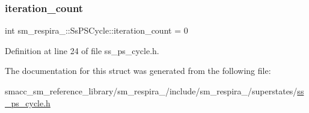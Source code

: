 \subsubsection{\texorpdfstring{iteration\+\_\+count}{iteration\_count}}
{\footnotesize\ttfamily int sm\+\_\+respira\+\_\+::\+Ss\+P\+S\+Cycle\+::iteration\+\_\+count = 0}



Definition at line 24 of file ss\+\_\+ps\+\_\+cycle.\+h.



The documentation for this struct was generated from the following file\+:\begin{DoxyCompactItemize}
\item 
smacc\+\_\+sm\+\_\+reference\+\_\+library/sm\+\_\+respira\+\_/include/sm\+\_\+respira\+\_/superstates/\hyperlink{ss__ps__cycle_8h}{ss\+\_\+ps\+\_\+cycle.\+h}\end{DoxyCompactItemize}
